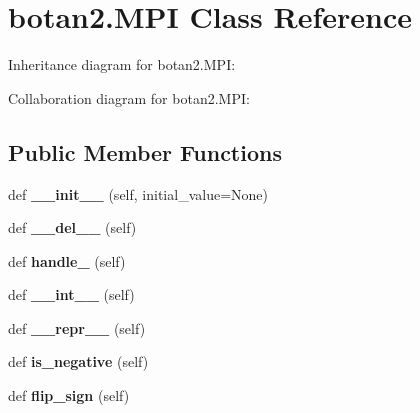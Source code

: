 \hypertarget{classbotan2_1_1_m_p_i}{}\section{botan2.\+M\+PI Class Reference}
\label{classbotan2_1_1_m_p_i}


Inheritance diagram for botan2.\+M\+PI\+:


Collaboration diagram for botan2.\+M\+PI\+:
\subsection*{Public Member Functions}
\begin{DoxyCompactItemize}
\item 
\mbox{\label{classbotan2_1_1_m_p_i_a2602cf59e73206bd0adea39fb264dec8}} 
def {\bfseries \+\_\+\+\_\+init\+\_\+\+\_\+} (self, initial\+\_\+value=None)
\item 
\mbox{\label{classbotan2_1_1_m_p_i_ad4434e9f8ce5b660db49fe5836dca72d}} 
def {\bfseries \+\_\+\+\_\+del\+\_\+\+\_\+} (self)
\item 
\mbox{\label{classbotan2_1_1_m_p_i_a2a2025e621c0bdfb893d1e17ce526dad}} 
def {\bfseries handle\+\_\+} (self)
\item 
\mbox{\label{classbotan2_1_1_m_p_i_ab0a3af18f857c3a8542ba2ac656ae29a}} 
def {\bfseries \+\_\+\+\_\+int\+\_\+\+\_\+} (self)
\item 
\mbox{\label{classbotan2_1_1_m_p_i_a9816d06c27d1535933bd880d943c8255}} 
def {\bfseries \+\_\+\+\_\+repr\+\_\+\+\_\+} (self)
\item 
\mbox{\label{classbotan2_1_1_m_p_i_a0056136722e1ed148750c8119b06bb35}} 
def {\bfseries is\+\_\+negative} (self)
\item 
\mbox{\label{classbotan2_1_1_m_p_i_af9129bb0bd534675428b87c048c5558c}} 
def {\bfseries flip\+\_\+sign} (self)
\item 
\mbox{\label{classbotan2_1_1_m_p_i_aab900b4e84c828f7df547d846f66d2ab}} 

\end{DoxyCompactItemize}
